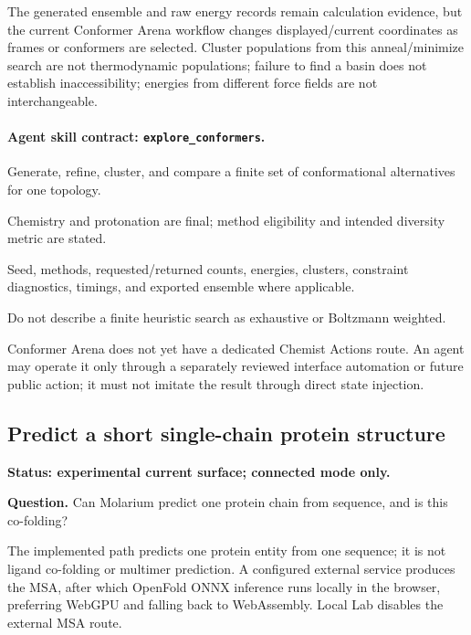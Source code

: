 \begin{small}
The generated ensemble and raw energy records remain calculation evidence, but the current Conformer Arena workflow changes displayed/current coordinates as frames or conformers are selected. Cluster populations from this anneal/minimize search are not thermodynamic populations; failure to find a basin does not establish inaccessibility; energies from different force fields are not interchangeable.

\paragraph{Agent skill contract: \texttt{explore\_conformers}.}

\begin{description}[leftmargin=2.2cm,style=nextline]
\item[Goal] Generate, refine, cluster, and compare a finite set of conformational alternatives for one topology.
\item[Preconditions] Chemistry and protonation are final; method eligibility and intended diversity metric are stated.
\item[Evidence] Seed, methods, requested/returned counts, energies, clusters, constraint diagnostics, timings, and exported ensemble where applicable.
\item[Stop] Do not describe a finite heuristic search as exhaustive or Boltzmann weighted.
\end{description}

Conformer Arena does not yet have a dedicated Chemist Actions route. An agent may operate it only through a separately reviewed interface automation or future public action; it must not imitate the result through direct state injection.

\subsection{Predict a short single-chain protein structure}\label{appB:fold}

\textbf{Status: experimental current surface; connected mode only.}

\textbf{Question.} Can Molarium predict one protein chain from sequence, and is this co-folding?

The implemented path predicts one protein entity from one sequence; it is not ligand co-folding or multimer prediction. A configured external service produces the MSA, after which OpenFold ONNX inference runs locally in the browser, preferring WebGPU and falling back to WebAssembly. Local Lab disables the external MSA route.


\end{small}
